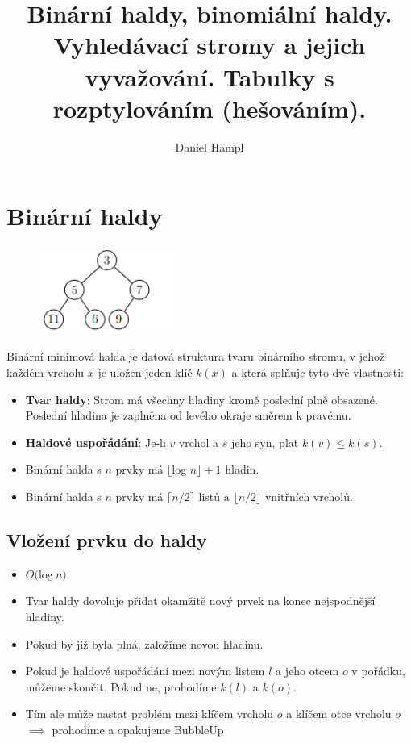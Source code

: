 \documentclass{szzclass}
\title{Binární haldy, binomiální haldy. Vyhledávací stromy a   jejich vyvažování. Tabulky s rozptylováním (hešováním).}
\author{Daniel Hampl}
\begin{document}
\maketitle

\tableofcontents
\newpage

\section{Binární haldy}

\begin{figure}[h]
\centering
\includegraphics[width=0.4\textwidth]{topics/bi-spol-05/images/binary-heap.png}
\end{figure}

Binární minimová halda je datová struktura tvaru binárního
stromu, v jehož každém vrcholu $x$ je uložen jeden klíč $k(x)$ a která
splňuje tyto dvě vlastnosti:
\begin{itemize}
    \item \textbf{Tvar haldy}: Strom má všechny hladiny kromě poslední plně
    obsazené. Poslední hladina je zaplněna od levého okraje směrem k pravému.
    \item \textbf{Haldové uspořádání}: Je-li $v$ vrchol a $s$ jeho syn, plat $k(v)\leq k(s)$.
    \item Binární halda s $n$ prvky má $\lfloor $log $ n \rfloor + 1$ hladin.
    \item Binární halda s $n$ prvky má $\lceil n/2\rceil$ listů a $\lfloor n/2 \rfloor$ vnitřních vrcholů.
\end{itemize}

\subsection{Vložení prvku do haldy}
\begin{itemize}
    \item $O($log$~n)$
    \item Tvar haldy dovoluje přidat okamžitě nový prvek na konec nejspodnější hladiny.
    \item Pokud by již byla plná, založíme novou hladinu.
    \item Pokud je haldové uspořádání mezi novým listem $l$ a jeho otcem $o$ v pořádku, můžeme skončit. Pokud ne, prohodíme $k(l)$ a $k(o)$.
    \item Tím ale může nastat problém mezi klíčem vrcholu $o$ a klíčem otce vrcholu $o$ $\implies$  prohodíme a opakujeme BubbleUp
\end{itemize}
\end{document}
